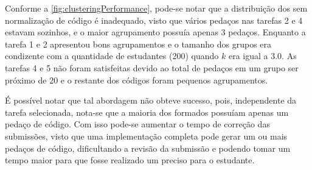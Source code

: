 		Conforme a \cref{fig:clusteringPerformance}, pode-se notar que a
		distribuição dos  sem normalização de código é inadequado,
		visto que vários pedaços nas tarefas 2 e 4 estavam sozinhos, e o maior
		agrupamento possuía apenas 3 pedaços. Enquanto a tarefa 1 e 2 apresentou
		bons agrupamentos e o tamanho dos grupos era condizente com a quantidade de
		estudantes (200) quando $k$ era igual a 3.0. As tarefas 4 e 5 não foram
		satisfeitas devido ao total de pedaços em um grupo ser próximo de 20 e o
		restante dos códigos foram pequenos agrupamentos.
		
		É possível notar que tal abordagem não obteve sucesso, pois, independente da
		tarefa selecionada, nota-se que a maioria dos  formados
		possuíam apenas um pedaço de código. Com isso pode-se aumentar o tempo de
		correção das submissões, visto que uma implementação completa pode gerar um
		ou mais pedaços de código, dificultando a revisão da submissão e podendo tomar
		um tempo maior para que fosse realizado um  preciso para o
		estudante.
		

